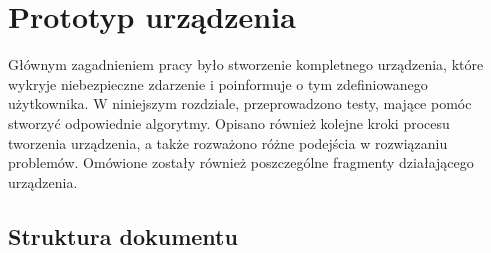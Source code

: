 \chapter{Prototyp urządzenia}
\label{cha:prototyp}

Głównym zagadnieniem pracy było stworzenie kompletnego urządzenia, które wykryje niebezpieczne zdarzenie i poinformuje o tym zdefiniowanego użytkownika. W niniejszym rozdziale, przeprowadzono testy, mające pomóc stworzyć odpowiednie algorytmy. Opisano również kolejne kroki procesu tworzenia urządzenia, a także rozważono różne podejścia w rozwiązaniu problemów. Omówione zostały również poszczególne fragmenty działającego urządzenia.

\section{Struktura dokumentu}
